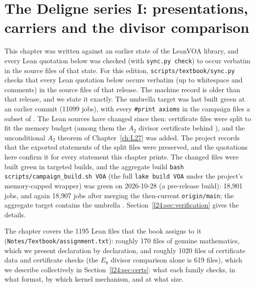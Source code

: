\chapter[The Deligne series I: presentations, carriers, divisor comparison]{The Deligne series I: presentations, carriers and the divisor comparison}\label{ch:L24}
\begingroup\setlength{\emergencystretch}{3em}\sloppy

\providecommand{\ltwentyfourg}{\mathfrak g}
\providecommand{\ltwentyfourJ}{J_\infty}
\providecommand{\ltwentyfourgr}{\operatorname{gr}^{\mathrm{Li}}}
\providecommand{\ltwentyfourIns}{I_2^{\mathrm{ns}}}
\providecommand{\ltwentyfourRt}{\widetilde R}
\providecommand{\ltwentyfourHilb}{\operatorname{Hilb}}
\providecommand{\ltwentyfourch}{\operatorname{ch}}
\providecommand{\ltwentyfourvac}{\mathbf 1}

This chapter was written against an earlier state of the LeanVOA library, and every
Lean quotation below was checked (with \texttt{sync.py check}) to occur verbatim in the source files of that state. For this edition, \texttt{scripts/textbook/sync.py} checks that every Lean quotation below occurs verbatim (up to whitespace and comments) in the source files of that release. The
machine record is older than that release, and we state it exactly. The umbrella target  was last
built green at an earlier commit (11099 jobs), with every \texttt{\#print axioms} in the campaign files a subset of
. The Lean sources have changed since then: certificate files were split
to fit the memory budget (among them the $A_2$ divisor certificate behind ), and the
unconditional $A_2$ theorem of Chapter~\ref{ch:L27} was added. The project records that the exported statements of the
split files were preserved, and the quotations here confirm it for every statement this chapter prints. The changed files
were built green in targeted builds, and the aggregate build \texttt{bash scripts/campaign\_build.sh VOA} (the full \texttt{lake build VOA} under the project's memory-capped wrapper) was green on 2026-10-28 (a pre-release build): 18{,}901 jobs, and again 18{,}907 jobs after merging the then-current \texttt{origin/main}; the aggregate target contains the umbrella . Section~\ref{l24:sec:verification} gives the details.

The chapter covers the 1195 Lean files that the book assigns to it
(\texttt{Notes/Textbook/assignment.txt}): roughly 170 files of genuine mathematics, which we present
declaration by declaration, and roughly 1020 files of certificate data and certificate checks (the
$E_8$ divisor comparison alone is 619 files), which we describe collectively in
Section~\ref{l24:sec:certs}: what each family checks, in what format, by which kernel mechanism, and at
what size.

